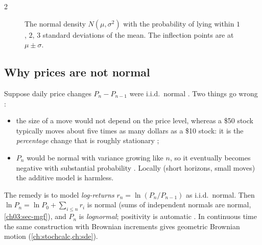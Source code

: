 \begin{paracol}{2}
\begin{figure}[!htb]
\centering
{}
\caption{The normal density $N(\mu,\sigma^2)$ with the probability of lying within $1$, $2$, $3$ standard deviations
of the mean. The inflection points are at $\mu\pm\sigma$.}\label{ch03:fig-normal}
\end{figure}

\subsection{Why prices are not normal}
Suppose daily price changes $P_n-P_{n-1}$ were i.i.d.\ normal . Two things go wrong
:
\begin{itemize}
  \item the size of a move would not depend on the price level, whereas a \$50 stock typically moves
        about five times as many dollars as a \$10 stock: it is the \emph{percentage} change that is
        roughly stationary ;
  \item $P_n$ would be normal with variance growing like $n$, so it eventually becomes negative with
        substantial probability . Locally (short horizons, small moves) the additive model
        is harmless.
\end{itemize}
The remedy is to model \emph{log-returns} $r_n=\ln(P_n/P_{n-1})$ as i.i.d.\ normal. Then
$\ln P_n=\ln P_0+\sum_{i\le n}r_i$ is normal (sums of independent normals are normal,
\cref{ch03:sec-mgf}), and $P_n$ is \emph{lognormal}; positivity is automatic . In continuous
time the same construction with Brownian increments gives geometric Brownian motion
 (\cref{ch:stochcalc,ch:sde}).


\end{paracol}

